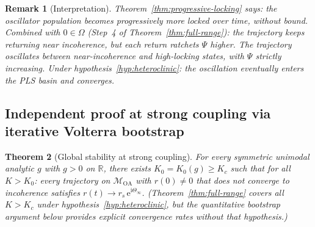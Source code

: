 \documentclass[11pt,a4paper]{article}
\newtheorem{theorem}{Theorem}[section]
\newtheorem{remark}[theorem]{Remark}
\theoremstyle{definition}
\newcommand{\R}{\mathbb{R}}
\begin{document}
\begin{remark}[Interpretation]
Theorem~\ref{thm:progressive-locking} says: the oscillator population becomes progressively more locked over time, without bound. Combined with $0 \in \Omega$ (Step~4 of Theorem~\ref{thm:full-range}): the trajectory keeps returning near incoherence, but each return ratchets $\Psi$ higher. The trajectory oscillates between near-incoherence and high-locking states, with $\Psi$ strictly increasing. Under hypothesis~\ref{hyp:heteroclinic}: the oscillation eventually enters the PLS basin and converges.
\end{remark}

\subsection{Independent proof at strong coupling via iterative Volterra bootstrap}

\begin{theorem}[Global stability at strong coupling]\label{thm:strong-coupling}
For every symmetric unimodal analytic $g$ with $g > 0$ on $\R$, there exists $K_0 = K_0(g) \geq K_c$ such that for all $K > K_0$: every trajectory on $\mathcal{M}_{\mathrm{OA}}$ with $r(0) \neq 0$ that does not converge to incoherence satisfies $r(t) \to r_s\,\mathrm{e}^{\mathrm{i}\Theta_\infty}$. (Theorem~\ref{thm:full-range} covers all $K > K_c$ under hypothesis~\ref{hyp:heteroclinic}, but the quantitative bootstrap argument below provides explicit convergence rates without that hypothesis.)
\end{theorem}
\end{document}

